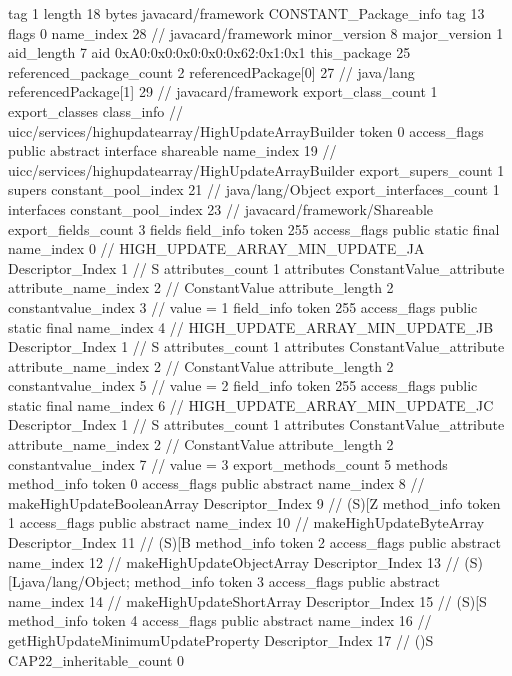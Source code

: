 {{{			tag	1
			length	18
			bytes	javacard/framework
		}
		CONSTANT_Package_info {
			tag	13
			flags	0
			name_index	28		// javacard/framework
			minor_version	8
			major_version	1
			aid_length	7
			aid	0xA0:0x0:0x0:0x0:0x62:0x1:0x1
		}
	}
	this_package	25
	referenced_package_count	2
	referencedPackage[0]	27		// java/lang
	referencedPackage[1]	29		// javacard/framework
	export_class_count	1
	export_classes {
		class_info {		// uicc/services/highupdatearray/HighUpdateArrayBuilder
			token	0
			access_flags	public abstract interface shareable
			name_index	19		// uicc/services/highupdatearray/HighUpdateArrayBuilder
			export_supers_count	1
			supers {
				constant_pool_index	21		// java/lang/Object
			}
			export_interfaces_count	1
			interfaces {
				constant_pool_index	23		// javacard/framework/Shareable
			}
			export_fields_count	3
			fields {
			field_info {
				token	255
				access_flags	public static final
				name_index	0		// HIGH_UPDATE_ARRAY_MIN_UPDATE_JA
				Descriptor_Index	1		// S
				attributes_count	1
				attributes {
				ConstantValue_attribute {
					attribute_name_index	2		// ConstantValue
					attribute_length	2
					constantvalue_index	3		// value = 1
				}
				}
			}
			field_info {
				token	255
				access_flags	public static final
				name_index	4		// HIGH_UPDATE_ARRAY_MIN_UPDATE_JB
				Descriptor_Index	1		// S
				attributes_count	1
				attributes {
				ConstantValue_attribute {
					attribute_name_index	2		// ConstantValue
					attribute_length	2
					constantvalue_index	5		// value = 2
				}
				}
			}
			field_info {
				token	255
				access_flags	public static final
				name_index	6		// HIGH_UPDATE_ARRAY_MIN_UPDATE_JC
				Descriptor_Index	1		// S
				attributes_count	1
				attributes {
				ConstantValue_attribute {
					attribute_name_index	2		// ConstantValue
					attribute_length	2
					constantvalue_index	7		// value = 3
				}
				}
			}
			}
			export_methods_count	5
			methods {
				method_info {
					token	0
					access_flags	public abstract
					name_index	8		// makeHighUpdateBooleanArray
					Descriptor_Index	9		// (S)[Z
				}
				method_info {
					token	1
					access_flags	public abstract
					name_index	10		// makeHighUpdateByteArray
					Descriptor_Index	11		// (S)[B
				}
				method_info {
					token	2
					access_flags	public abstract
					name_index	12		// makeHighUpdateObjectArray
					Descriptor_Index	13		// (S)[Ljava/lang/Object;
				}
				method_info {
					token	3
					access_flags	public abstract
					name_index	14		// makeHighUpdateShortArray
					Descriptor_Index	15		// (S)[S
				}
				method_info {
					token	4
					access_flags	public abstract
					name_index	16		// getHighUpdateMinimumUpdateProperty
					Descriptor_Index	17		// ()S
				}
			}
			CAP22_inheritable_count	0
		}
	}
}
